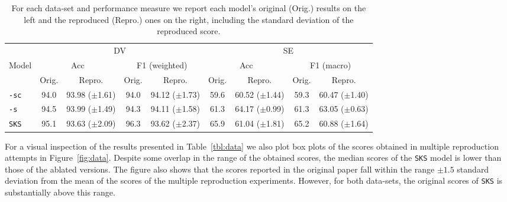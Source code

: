 \begin{table*}[h]
\centering
\begin{tabular}{lcccccccc}
\toprule
 & \multicolumn{4}{c}{DV}                                                                                & \multicolumn{4}{c}{SE}                                                                               \\
  \cmidrule(lr){2-5} \cmidrule(lr){6-9}
\multirow{2}{*}{Model}        & \multicolumn{2}{c}{Acc}                           & \multicolumn{2}{c}{F1 (weighted)}                 & \multicolumn{2}{c}{Acc}                          & \multicolumn{2}{c}{F1 (macro)}                    
                       \\ 
\cmidrule(lr){2-3} \cmidrule(lr){4-5}
\cmidrule(lr){6-7} \cmidrule(lr){8-9}
  & Orig. & Repro. &
  Orig. & Repro. &
  Orig. & Repro. &
  Orig. & Repro.  \\
  \cmidrule{2-9}
\texttt{-sc}                    & \multicolumn{1}{c}{94.0} & 93.98 ($\pm$1.61) & \multicolumn{1}{c}{94.0} & 94.12 ($\pm$1.73) & \multicolumn{1}{c}{59.6} & 60.52 ($\pm$1.44)   & \multicolumn{1}{c}{59.3} & 60.47 ($\pm$1.40)  \\
\texttt{-s}                     & \multicolumn{1}{c}{94.5} & 93.99 ($\pm$1.49) & \multicolumn{1}{c}{94.3} & 94.11 ($\pm$1.58) & \multicolumn{1}{c}{61.3} & 64.17 ($\pm$0.99)      & \multicolumn{1}{c}{61.3} & 63.05 ($\pm$0.63) \\
\texttt{SKS}                    & \multicolumn{1}{c}{95.1} & 93.63 ($\pm$2.09) & \multicolumn{1}{c}{96.3} & 93.62 ($\pm$2.37) & \multicolumn{1}{c}{65.9} & 61.04 ($\pm$1.81) & \multicolumn{1}{c}{65.2} & 60.88 ($\pm$1.64)\\

\bottomrule
\end{tabular}
  \caption{\label{tbl:data} For each data-set and performance measure we report each model's original (Orig.) results on the left and the reproduced (Repro.) ones on the right, including the standard deviation of the reproduced score.}
\label{table:comparison_original_repro_results}
\end{table*}

For a visual inspection of the results presented in Table~\ref{tbl:data} we also plot box plots of the scores obtained in multiple reproduction attempts in Figure~\ref{fig:data}.
Despite some overlap in the range of the obtained scores, the median scores of the \texttt{SKS} model is lower than those of the ablated versions. The figure also shows that the scores reported in the original paper fall within the range $\pm 1.5$ standard deviation from the mean of the scores of the multiple reproduction experiments.
However, for both data-sets, the original scores of \texttt{SKS} is substantially above this range.

